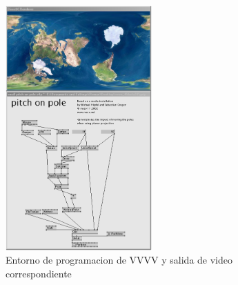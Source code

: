\begin{figure}[H]
  \centering
    \includegraphics[width=0.5\textwidth]{./Cap3_aplicaciones/apps-vvvv.png}
  \caption{Entorno de programacion de VVVV y salida de video correspondiente}
  \label{fig:Apps-VVVV}
\end{figure}

